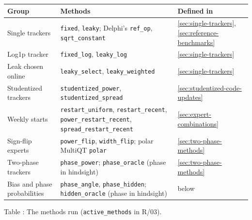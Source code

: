 \documentclass[11pt,a4paper]{article}
\theoremstyle{definition}
\theoremstyle{remark}
\begin{document}
\begin{center}\small
\renewcommand{\arraystretch}{1.15}
\begin{tabularx}{\textwidth}{@{}>{\raggedright\arraybackslash}p{}
 >{\raggedright\arraybackslash}X >{\raggedright\arraybackslash}p{}@{}}
\toprule
Group & Methods & Defined in\\
\midrule
Single trackers & \texttt{fixed}, \texttt{leaky}; Delphi's \texttt{ref\_op}, \texttt{sqrt\_constant}
 & \ref{sec:single-trackers}, \ref{sec:reference-benchmarks}\\
Log1p tracker & \texttt{fixed\_log}, \texttt{leaky\_log} & \ref{sec:single-trackers}\\
Leak chosen online & \texttt{leaky\_select}, \texttt{leaky\_weighted} & \ref{sec:single-trackers}\\
Studentized trackers & \texttt{studentized\_power}, \texttt{studentized\_spread}
 & \ref{sec:studentized-code-updates}\\
Weekly starts & \texttt{restart\_uniform}, \texttt{restart\_recent},
 \texttt{power\_restart\_recent}, \texttt{spread\_restart\_recent} & \ref{sec:expert-combinations}\\
Sign-flip experts & \texttt{power\_flip}, \texttt{width\_flip}; polar MultiQT
 \texttt{polar} & \ref{sec:two-phase-methods}\\
Two-phase trackers & \texttt{phase\_power}; \texttt{phase\_oracle} (phase in hindsight)
 & \ref{sec:two-phase-methods}\\
Bias and phase probabilities & \texttt{phase\_angle}, \texttt{phase\_hidden};
 \texttt{hidden\_oracle} (phase in hindsight) & below\\
\bottomrule
\end{tabularx}
\end{center}
\label{tab:methods-run}
\begin{center}\small Table \thetable: The methods run (\texttt{active\_methods}
in R/03).
\end{center}
\end{document}
